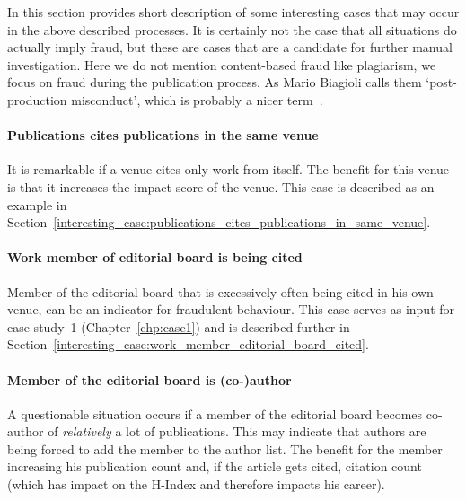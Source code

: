 \documentclass{ou-report}
\newcommand{\outline}[1]{{\color{blue} #1}}
\begin{document}
In this section provides short description of some interesting cases that may 
occur in the above described processes.
It is certainly not the case that all situations do actually imply fraud, but 
these are cases that are a candidate for further manual investigation.
Here we do not mention content-based fraud like plagiarism, we focus on fraud
during the publication process. As Mario Biagioli calls them `post-production 
misconduct', which is probably a nicer term~\cite{biagioli2020gaming}.

\paragraph{Publications cites publications in the same venue} It is remarkable
if a venue cites only work from itself. The benefit for this venue is that it
increases the impact score of the venue. This case is described as an example in 
Section~\ref{interesting_case:publications_cites_publications_in_same_venue}.
\paragraph{Work member of editorial board is being cited} Member of the
editorial board that is excessively often being cited in his own venue, can be
an indicator for fraudulent behaviour. This case serves as input for case 
study~1 (Chapter~\ref{chp:case1}) and is described further in 
Section~\ref{interesting_case:work_member_editorial_board_cited}.
\paragraph{Member of the editorial board is (co-)author} 
A questionable situation occurs if a member of the editorial board becomes co-
author of \textit{relatively} a lot of publications. This may indicate that 
authors are being forced to add the member to the author list. The benefit for
the member increasing his publication count and, if the article gets cited, 
citation count (which has impact on the H-Index and therefore impacts his 
career).
\end{document}
